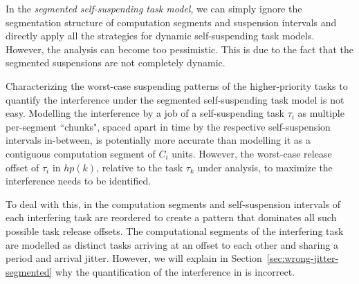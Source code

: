 \label{sec:model-interfering-improving}

In the \emph{segmented self-suspending task model}, we can simply ignore the segmentation structure of computation segments and suspension intervals 
and directly apply all the strategies for dynamic self-suspending task models. However, the analysis can become too pessimistic. This is due to the fact 
that the segmented suspensions are not completely dynamic. 


Characterizing the worst-case 
suspending patterns of the higher-priority tasks to quantify the interference under the segmented self-suspending task model is not easy. 
Modelling the interference by a job of a self-suspending task $\tau_i$ as multiple per-segment ``chunks", spaced apart in time by 
the respective self-suspension intervals in-between, is potentially more accurate than modelling it as a contiguous computation segment of $C_i$ units.
However, the worst-case release offset of $\tau_i$ in $hp(k)$, relative to the task $\tau_k$ under analysis, to maximize the interference needs to be identified.

To deal with this, in \cite{RTCSA-BletsasA05} the computation segments and self-suspension intervals of each interfering task are reordered 
to create a pattern that dominates all such possible task release offsets. The computational segments of the interfering task are modelled 
as distinct tasks arriving at an offset to each other and sharing a period and arrival jitter. However, we will explain in 
Section~\ref{sec:wrong-jitter-segmented} why the quantification of the interference in \cite{RTCSA-BletsasA05} is incorrect. 

